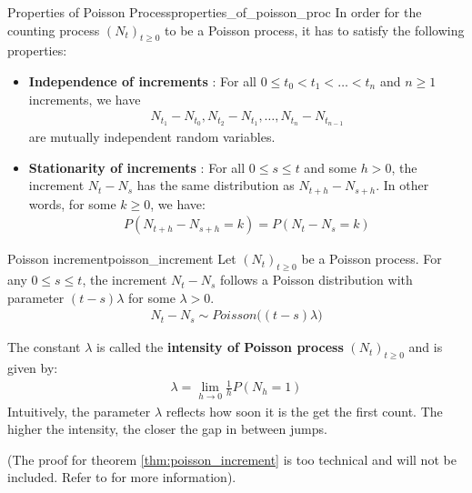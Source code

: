 \begin{proposition}{Properties of Poisson Process}{properties_of_poisson_proc}
    In order for the counting process $(N_t)_{t\ge0}$ to be a Poisson process, it has to satisfy the following properties:
    \begin{itemize}
        \item \textbf{Independence of increments} : For all $0 \le t_0 < t_1 < \dots < t_n$ and $n\ge1$ increments, we have
        \begin{align*}
            N_{t_1} - N_{t_0}, N_{t_2} - N_{t_1}, \dots, N_{t_n} - N_{t_{n-1}}
        \end{align*}
        \noindent are mutually independent random variables.
        \item \textbf{Stationarity of increments} : For all $0 \le s \le t$ and some $h>0$, the increment $N_{t} - N_s$ has the same distribution as $N_{t+h} - N_{s+h}$. In other words, for some $k\ge 0$, we have:
        \begin{align*}
            P(N_{t+h} - N_{s+h} = k) = P(N_t - N_s = k)
        \end{align*}
    \end{itemize}
\end{proposition}

\begin{theorem}{Poisson increment}{poisson_increment}
    Let $(N_t)_{t\ge0}$ be a Poisson process. For any $0 \le s \le t$, the increment $N_t-N_s$ follows a Poisson distribution with parameter $(t-s)\lambda$ for some $\lambda > 0$.
    \begin{align*}
        N_t - N_s \sim Poisson\Big( (t-s)\lambda \Big)
    \end{align*}

    \noindent The constant $\lambda$ is called the \textbf{intensity of Poisson process} $(N_t)_{t\ge0}$ and is given by:
    \begin{align*}
        \lambda = \lim_{h\to 0}\frac{1}{h}P(N_h=1)
    \end{align*}
    \noindent Intuitively, the parameter $\lambda$ reflects how soon it is the get the first count. The higher the intensity, the closer the gap in between jumps.
\end{theorem}
\begin{proof*}
    (The proof for theorem \ref{thm:poisson_increment} is too technical and will not be included. Refer to \cite{book:Bosq1996} for more information).
\end{proof*}

